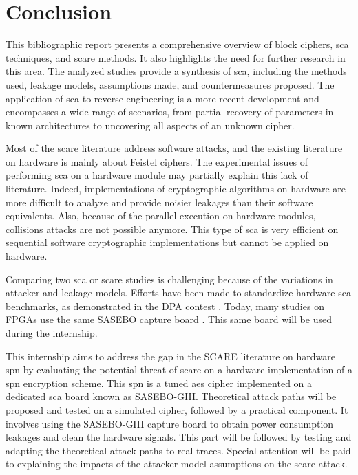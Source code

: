 \documentclass[11pt]{sdm}
\begin{document}



\section{Conclusion}

This bibliographic report presents a comprehensive overview of block ciphers, \gls{sca} techniques, and \gls{scare} methods.
It also highlights the need for further research in this area.
The analyzed studies provide a synthesis of \gls{sca}, including the methods used, leakage models, assumptions made, and countermeasures proposed.
The application of \gls{sca} to reverse engineering is a more recent development and encompasses a wide range of scenarios, from partial recovery of parameters in known architectures to uncovering all aspects of an unknown cipher.

Most of the \gls{scare} literature address software attacks, and the existing literature on hardware is mainly about Feistel ciphers.
The experimental issues of performing \gls{sca} on a hardware module may partially explain this lack of literature.
Indeed, implementations of cryptographic algorithms on hardware are more difficult to analyze and provide noisier leakages than their software equivalents.
Also, because of the parallel execution on hardware modules, collisions attacks are not possible anymore.
This type of \gls{sca} is very efficient on sequential software cryptographic implementations but cannot be applied on hardware.

Comparing two \gls{sca} or \gls{scare} studies is challenging because of the variations in attacker and leakage models.  
Efforts have been made to standardize hardware \gls{sca} benchmarks, as demonstrated in the DPA contest \parencite{Clavier_Danger_Duc_Elaabid_Gérard_Guilley_Heuser_Kasper_Li_Lomné_et_al_2014}.
Today, many studies on FPGAs use the same SASEBO capture board \parencite{Satoh}.
This same board will be used during the internship.

This internship aims to address the gap in the SCARE literature on hardware \gls{spn} by evaluating the potential threat of \gls{scare} on a hardware implementation of a \gls{spn} encryption scheme.
This \gls{spn} is a tuned \gls{aes} cipher implemented on a dedicated \gls{sca} board known as SASEBO-GIII.
Theoretical attack paths will be proposed and tested on a simulated cipher, followed by a practical component.
It involves using the SASEBO-GIII capture board to obtain power consumption leakages and clean the hardware signals.
This part will be followed by testing and adapting the theoretical attack paths to real traces.
Special attention will be paid to explaining the impacts of the attacker model assumptions on the \gls{scare} attack.





\printbibliography[title=Bibliographie]
\end{document}
